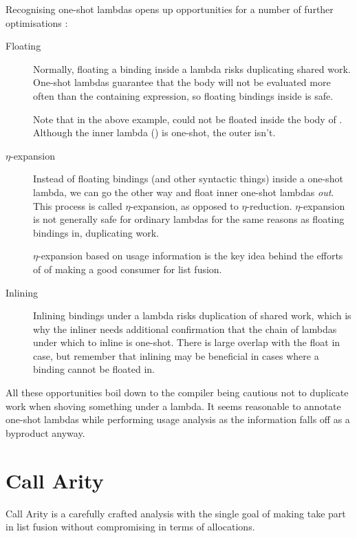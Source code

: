 Recognising one-shot lambdas opens up opportunities for a number of further optimisations \parencite[section~6.6.2]{warnsbrough}:
\begin{description}
  \item[Floating]
    Normally, floating a  binding inside a lambda risks duplicating shared work.
    One-shot lambdas guarantee that the body will not be evaluated more often than the containing expression, so floating bindings inside is safe.

    Note that in the above example,  could not be floated inside the body of .
    Although the inner lambda () is one-shot, the outer isn't.
  \item[$\eta$-expansion]
    Instead of floating  bindings (and other syntactic things) inside a one-shot lambda, we can go the other way and float inner one-shot lambdas \emph{out}.
    This process is called $\eta$-expansion, as opposed to $\eta$-reduction.
    $\eta$-expansion is not generally safe for ordinary lambdas for the same reasons as floating  bindings in, \eg duplicating work.

    $\eta$-expansion based on usage information is the key idea behind the efforts of \textcite{callarity} of making  a good consumer for list fusion.
  \item[Inlining]
    Inlining bindings under a lambda risks duplication of shared work, which is why the inliner needs additional confirmation that the chain of lambdas under which to inline is one-shot.
    There is large overlap with the float in case, but remember that inlining may be beneficial in cases where a binding cannot be floated in.
\end{description}

All these opportunities boil down to the compiler being cautious not to duplicate work when shoving something under a lambda.
It seems reasonable to annotate one-shot lambdas while performing usage analysis as the information falls off as a byproduct anyway.

\section{Call Arity}\label{sec:callarity}

Call Arity \parencite{callarity} is a carefully crafted analysis with the single goal of making  take part in list fusion without compromising in terms of allocations.


